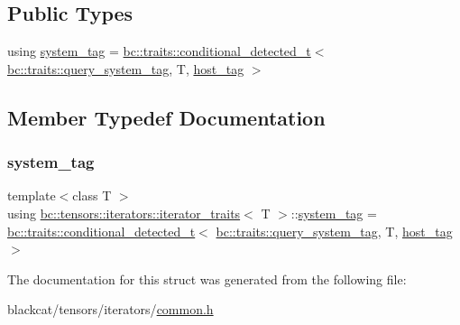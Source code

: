 \subsection*{Public Types}
\begin{DoxyCompactItemize}
\item 
using \hyperlink{structbc_1_1tensors_1_1iterators_1_1iterator__traits_a43076dd36e9b6ed3ca49249faeb849fb}{system\+\_\+tag} = \hyperlink{namespacebc_1_1traits_a1a6d378947ec32acd457890854bcd592}{bc\+::traits\+::conditional\+\_\+detected\+\_\+t}$<$ \hyperlink{namespacebc_1_1traits_acfa34d40f06d5122586d7adefdfeb42f}{bc\+::traits\+::query\+\_\+system\+\_\+tag}, T, \hyperlink{structbc_1_1host__tag}{host\+\_\+tag} $>$
\end{DoxyCompactItemize}


\subsection{Member Typedef Documentation}
\mbox{\label{structbc_1_1tensors_1_1iterators_1_1iterator__traits_a43076dd36e9b6ed3ca49249faeb849fb}} 
\subsubsection{\texorpdfstring{system\+\_\+tag}{system\_tag}}
{\footnotesize\ttfamily template$<$class T $>$ \\
using \hyperlink{structbc_1_1tensors_1_1iterators_1_1iterator__traits}{bc\+::tensors\+::iterators\+::iterator\+\_\+traits}$<$ T $>$\+::\hyperlink{structbc_1_1tensors_1_1iterators_1_1iterator__traits_a43076dd36e9b6ed3ca49249faeb849fb}{system\+\_\+tag} =  \hyperlink{namespacebc_1_1traits_a1a6d378947ec32acd457890854bcd592}{bc\+::traits\+::conditional\+\_\+detected\+\_\+t}$<$ \hyperlink{namespacebc_1_1traits_acfa34d40f06d5122586d7adefdfeb42f}{bc\+::traits\+::query\+\_\+system\+\_\+tag}, T, \hyperlink{structbc_1_1host__tag}{host\+\_\+tag}$>$}



The documentation for this struct was generated from the following file\+:\begin{DoxyCompactItemize}
\item 
blackcat/tensors/iterators/\hyperlink{tensors_2iterators_2common_8h}{common.\+h}\end{DoxyCompactItemize}
